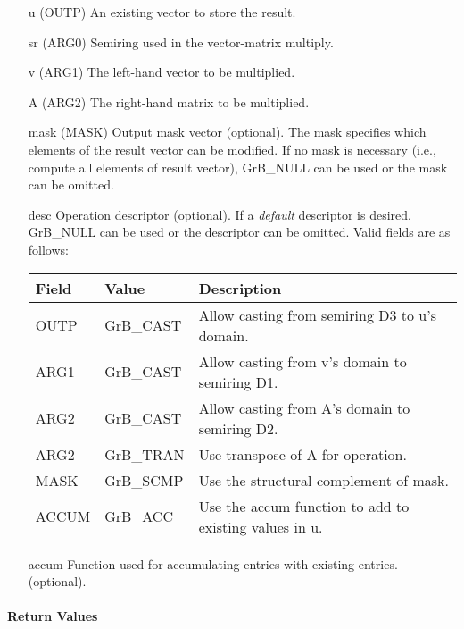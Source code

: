 \begin{itemize}[leftmargin=1.1in]
    \item[{\sf u}]    ({\sf OUTP}) An existing vector to store the result.
    \item[{\sf sr}]   ({\sf ARG0}) Semiring used in the vector-matrix multiply.
    \item[{\sf v}]    ({\sf ARG1}) The left-hand vector to be multiplied.
    \item[{\sf A}]    ({\sf ARG2}) The right-hand matrix to be multiplied.

    \item[{\sf mask}] ({\sf MASK}) Output mask vector (optional). The mask
    specifies which elements of the result vector can be modified.
    If no mask is necessary (i.e., compute all elements of result
    vector), {\sf GrB\_NULL} can be used or the mask can be omitted.

    \item[{\sf desc}]  Operation descriptor (optional). If a
    \emph{default} descriptor is desired, {\sf GrB\_NULL} can be
    used or the descriptor can be omitted. Valid fields are as follows: \\
    \begin{tabular}{lll}
    Field  & Value & Description \\
    \hline
    {\sf OUTP} & {\sf GrB\_CAST} & Allow casting from semiring D3 to {\sf u}'s domain. \\
    {\sf ARG1} & {\sf GrB\_CAST} & Allow casting from {\sf v}'s domain to semiring D1. \\
    {\sf ARG2} & {\sf GrB\_CAST} & Allow casting from {\sf A}'s domain to semiring D2. \\
    {\sf ARG2} & {\sf GrB\_TRAN} & Use transpose of {\sf A} for operation. \\
    {\sf MASK} & {\sf GrB\_SCMP} & Use the structural complement of {\sf mask}. \\
    {\sf ACCUM}& {\sf GrB\_ACC}  & Use the {\sf accum} function to add to existing values in {\sf u}.\\
    \end{tabular}

  	\item[{\sf accum}]  Function used for accumulating entries with existing  entries. (optional). 
\end{itemize}

\paragraph{Return Values}

